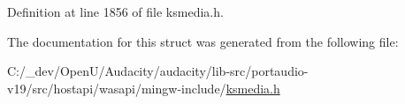 Definition at line 1856 of file ksmedia.\+h.



The documentation for this struct was generated from the following file\+:\begin{DoxyCompactItemize}
\item 
C\+:/\+\_\+dev/\+Open\+U/\+Audacity/audacity/lib-\/src/portaudio-\/v19/src/hostapi/wasapi/mingw-\/include/\hyperlink{ksmedia_8h}{ksmedia.\+h}\end{DoxyCompactItemize}
